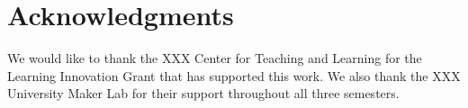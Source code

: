 \section{Acknowledgments} We would like to thank the XXX Center for Teaching and Learning for the Learning Innovation Grant that has supported this work. We also thank the XXX University Maker Lab for their support throughout all three semesters. 